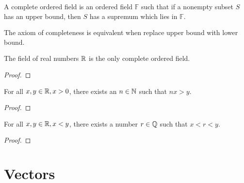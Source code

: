 \documentclass[11pt]{article}
\begin{document}
\begin{axiom}
  A complete ordered field is an ordered field \(\mathbb{F}\) such that if a nonempty subset \(S\) has an upper bound, then \(S\) has a supremum which lies in \(\mathbb{F}\).
\end{axiom}

\begin{exercise}
  The axiom of completeness is equivalent when replace upper bound with lower bound.
\end{exercise}
\begin{solution}

\end{solution}

\begin{theorem}
  The field of real numbers \(\R\) is the only complete ordered field. 
\end{theorem}
\begin{proof}
  
\end{proof}

\begin{proposition}
  For all \(x,y \in \mathbb{R}, x>0\), there exists an \(n \in \mathbb{N}\) such that \(nx > y\).
\end{proposition}
\begin{proof}
\end{proof}

\begin{proposition}[\(\Q\) is dense in \(\R\)]
  For all \(x,y \in \mathbb{R}, x<y\), there exists a number \(r\in \mathbb{Q}\) such that \(x<r<y\).
\end{proposition}
\begin{proof}
  
\end{proof}

\section{Vectors}
\end{document}
